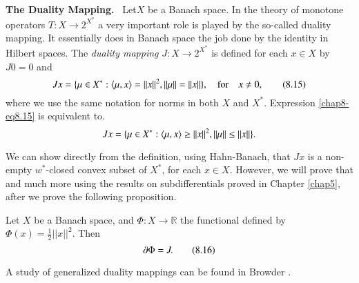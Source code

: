 \noindent
{\bf The Duality Mapping.}~ Let\pageoriginale $X$ be a Banach
space. In the theory of monotone operators $T:X\to 2^{X^{*}}$ a very
important role is played by the so-called duality mapping. It
essentially does in Banach space the job done by the identity in
Hilbert spaces. The {\em duality mapping} $J:X\to 2^{X^{*}}$ is
defined for each $x\in X$ by $J0=0$ and
\begin{equation*}
Jx=\{\mu\in X^{*}:\langle
\mu,x\rangle=||x||^{2},||\mu||=||x||\},\quad\text{for}\quad x\neq
0,\tag{8.15}\label{chap8-eq8.15} 
\end{equation*}
where we use the same notation for norms in both $X$ and
$X^{*}$. Expression \eqref{chap8-eq8.15} is equivalent to.
$$
Jx=\{\mu\in X^{*}:\langle \mu, x\rangle\geq ||x||^{2}, ||\mu||\leq ||x||\}.
$$

We can show directly from the definition, using Hahn-Banach, that $Jx$
is a non-empty $w^{*}$-closed convex subset of $X^{*}$, for each $x\in
X$. However, we will prove that and much more using the results on
subdifferentials proved in Chapter \ref{chap5}, after we prove the
following proposition.

\begin{proposition}\label{chap8-prop8.4}
Let $X$ be a Banach space, and $\Phi:X\to \mathbb{R}$ the functional
defined by $\Phi(x)=\frac{1}{2}||x||^{2}$. Then
\begin{equation*}
\partial\Phi=J.\tag{8.16}\label{chap8-eq8.16}
\end{equation*}
\end{proposition}

\begin{remark*}
A study of generalized duality mappings can be found in Browder
\cite{key23}. 
\end{remark*}

